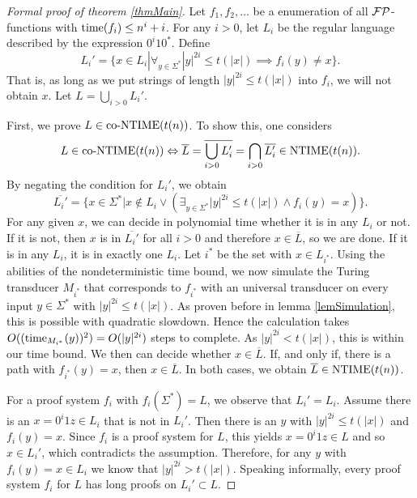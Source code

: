   \begin{proof}[Formal proof of theorem \ref{thmMain}]
    Let \(f_1, f_2, ...\) be a enumeration of all \(\mathcal{FP}\)-functions with \(\operatorname{time}(f_i) \leq n^i + i\).
    For any \(i > 0\), let \(L_i\) be the regular language described by the expression \(0^i10^*\). Define
      \[ L_i' = \{ x \in L_i | \forall_{ y \in \Sigma^* } |y|^{2i} \leq t(|x|) \implies f_i(y) \neq x \}. \]
    That is, as long as we put strings of length \(|y|^{2i} \leq t(|x|)\) into \(f_i\), we will not obtain \(x\).
    Let \(L = \bigcup_{i > 0} L_i'\).

    First, we prove \(L \in \text{co-NTIME}(t(n))\). To show this, one considers
      \[L \in \text{co-NTIME}(t(n)) \Leftrightarrow \overline{L} = \overline{\bigcup_{i > 0} L_i'} = \bigcap_{i > 0} \overline{L_i'} \in \text{NTIME}(t(n)).\]
    By negating the condition for \(L_i'\), we obtain
      \[ \overline{L_i'} = \{ x \in \Sigma^* | x \notin L_i \vee \left( \exists_{y \in \Sigma^*} |y|^{2i} \leq t(|x|) \wedge f_i(y) = x \right) \}. \]
    For any given \(x\), we can decide in polynomial time whether it is in any \(L_i\) or not. If it is not, then \(x\) is in \(\overline{L_i'}\) for all \(i > 0\) and therefore \(x \in \overline{L}\), so we are done. If it is in any \(L_i\), it is in exactly one \(L_i\). Let \(i^*\) be the set with \(x \in L_{i^*}\). 
    Using the abilities of the nondeterministic time bound, we now simulate the Turing transducer \(M_{i^*}\) that corresponds to \(f_{i^*}\) with an universal transducer on every input \(y \in \Sigma^*\) with \(|y|^{2i} \leq t(|x|)\). As proven before in lemma \ref{lemSimulation}, this is possible with quadratic slowdown. Hence the calculation takes \(O((\operatorname{time}_{M_{i^*}}(y))^2) = O(|y|^{2i})\) steps to complete. As \(|y|^{2i} < t(|x|)\), this is within our time bound.
    We then can decide whether \(x \in \overline{L}\). If, and only if, there is a path with \(f_{i^*}(y) = x\), then \(x \in \overline{L}\). In both cases, we obtain \(\overline{L} \in \text{NTIME}(t(n))\).

    For a proof system \(f_i\) with \(f_i(\Sigma^*) = L\), we observe that \(L_i' = L_i\). Assume there is an \(x = 0^i1z \in L_i\) that is not in \(L_i'\). Then there is an \(y\) with \(|y|^{2i} \leq t(|x|)\) and \(f_i(y) = x\). Since \(f_i\) is a proof system for \(L\), this yields \(x = 0^i1z \in L\) and so \(x \in L_i'\), which contradicts the assumption. Therefore, for any \(y\) with \(f_i(y) = x \in L_i\) we know that \(|y|^{2i} > t(|x|)\). Speaking informally, every proof system \(f_i\) for \(L\) has long proofs on \(L_i' \subset L\).


\end{proof}
